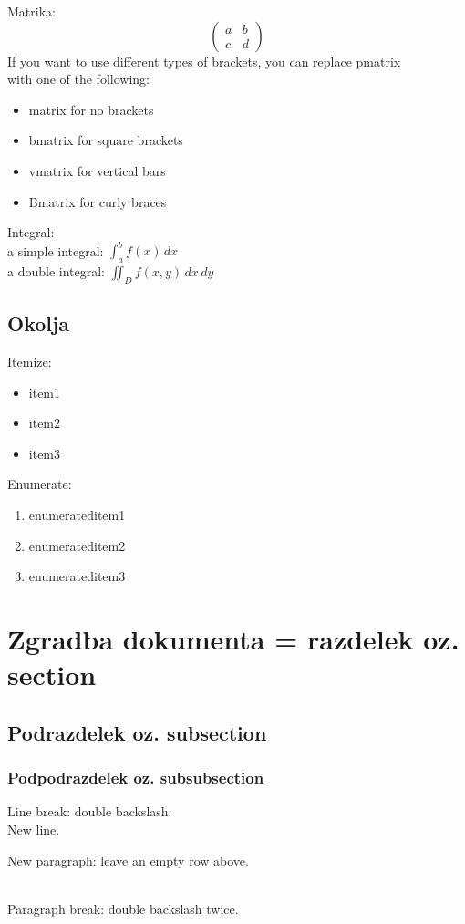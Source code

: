 \documentclass[a4paper]{article}
\begin{document}
Matrika:
\[
\begin{pmatrix}
a & b \\
c & d
\end{pmatrix}
\]
%
%
If you want to use different types of brackets, you can replace pmatrix \\
with one of the following:
\begin{itemize}
    \item matrix for no brackets
    \item bmatrix for square brackets
    \item vmatrix for vertical bars
    \item Bmatrix for curly braces
\end{itemize} 
%
Integral: \\
a simple integral: $\int_a^b f(x) \, dx$ \\
a double integral: $ \iint_D f(x, y) \, dx \, dy$



\subsection{Okolja}
Itemize:
\begin{itemize}
    \item item1
    \item item2
    \item item3
\end{itemize}
Enumerate:
\begin{enumerate}
    \item enumerateditem1
    \item enumerateditem2
    \item enumerateditem3
\end{enumerate}





\section{Zgradba dokumenta = razdelek oz. section}
\subsection{Podrazdelek oz. subsection}
\subsubsection{Podpodrazdelek oz. subsubsection}

Line break: double backslash. \\
New line.


New paragraph: leave an empty row above. \\
\begin {raggedright}
\\ Paragraph break: double backslash twice.
\end{raggedright}

\end{document}

